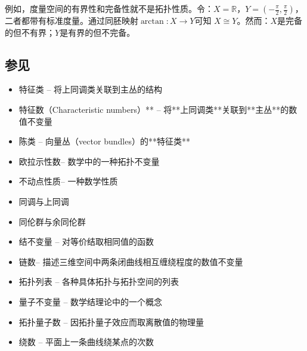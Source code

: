 例如，度量空间的有界性和完备性就不是拓扑性质。令：$X = \mathbb{R}$，$Y = \left(-\tfrac{\pi}{2}, \tfrac{\pi}{2}\right)$，二者都带有标准度量。通过同胚映射$
\arctan: X \to Y$可知 $X \cong Y$。然而：$X$是完备的但不有界；$Y$是有界的但不完备。
\subsection{参见}
\begin{itemize}
\item 特征类 – 将上同调类关联到主丛的结构
\item 特征数（Characteristic numbers）** – 将**上同调类**关联到**主丛**的数值不变量
\item 陈类 – 向量丛（vector bundles）的**特征类**
\item 欧拉示性数– 数学中的一种拓扑不变量
\item 不动点性质– 一种数学性质
\item 同调与上同调
\item 同伦群与余同伦群
\item 结不变量 – 对等价结取相同值的函数
\item 链数– 描述三维空间中两条闭曲线相互缠绕程度的数值不变量
\item 拓扑列表 – 各种具体拓扑与拓扑空间的列表
\item 量子不变量 – 数学结理论中的一个概念
\item 拓扑量子数 – 因拓扑量子效应而取离散值的物理量
\item 绕数  – 平面上一条曲线绕某点的次数
\end{itemize}

